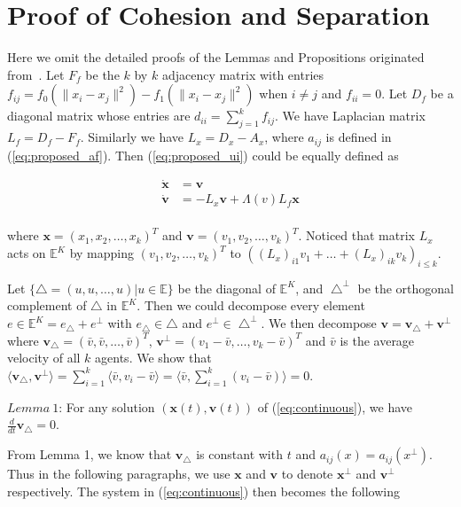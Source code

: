 \section{Proof of Cohesion and Separation}

Here we omit the detailed proofs of the Lemmas and Propositions originated from~\cite{CuckerDong2010}. Let $F_f$ be the $k$ by $k$ adjacency matrix with entries $f_{ij}=f_0(\|x_i-x_j\|^2)-f_1(\|x_i-x_j\|^2)$ when $i\neq j$ and $f_{ii}=0$. Let $D_f$ be a diagonal matrix whose entries are $d_{ii}=\sum_{j=1}^k f_{ij}$. We have Laplacian matrix $L_f=D_f-F_f$. Similarly we have $L_x=D_x-A_x$, where $a_{ij}$ is defined in (\ref{eq:proposed_af}). Then (\ref{eq:proposed_ui}) could be equally defined as

\begin{equation}\label{eq:continuous}
\begin{aligned}
\mathbf{\dot{x}}&=\mathbf{v}\\
\mathbf{\dot{v}}&=-L_x\mathbf{v}+\Lambda(v)L_f\mathbf{x}\\
\end{aligned}
\end{equation}

\noindent
where $\mathbf{x}=(x_1, x_2, \dots, x_k)^T$ and $\mathbf{v}=(v_1, v_2, \dots, v_k)^T$. Noticed that matrix $L_x$ acts on $\mathbb{E}^K$ by mapping $(v_1, v_2, \dots, v_k)^T$ to $((L_x)_{i1}v_1+\dots+(L_x)_{ik}v_k)_{i\leq k}$.

Let $\{\bigtriangleup={(u, u, \dots, u)|u\in\mathbb{E}}\}$ be the diagonal of $\mathbb{E}^K$, and $\bigtriangleup^{\perp}$ be the orthogonal complement of $\bigtriangleup$ in $\mathbb{E}^K$. Then we could decompose every element $e\in\mathbb{E}^K=e_{\bigtriangleup}+e^{\perp}$ with $e_{\bigtriangleup}\in\bigtriangleup$ and $e^{\perp}\in\bigtriangleup^{\perp}$. We then decompose $\mathbf{v}=\mathbf{v_{\bigtriangleup}+v^{\perp}}$ where $\mathbf{v_{\bigtriangleup}}=(\bar{v}, \bar{v}, \dots, \bar{v})^T$, $\mathbf{v^{\perp}}=(v_1-\bar{v}, \dots, v_k-\bar{v})^T$ and $\bar{v}$ is the average velocity of all $k$ agents. We show that $\langle\mathbf{v_{\bigtriangleup}}, \mathbf{v^{\perp}}\rangle=\sum_{i=1}^k\langle\bar{v},v_i-\bar{v}\rangle=\langle\bar{v},\sum_{i=1}^k(v_i-\bar{v})\rangle=0$.

$\mathit{Lemma\ 1}$: For any solution $(\mathbf{x}(t), \mathbf{v}(t))$ of (\ref{eq:continuous}), we have $\frac{d}{dt}\mathbf{v}_{\bigtriangleup}=0$.

From Lemma 1, we know that $\mathbf{v_{\bigtriangleup}}$ is constant with $t$ and $a_{ij}(x)=a_{ij}(x^{\perp})$. Thus in the following paragraphs, we use $\mathbf{x}$ and $\mathbf{v}$ to denote $\mathbf{x}^{\perp}$ and $\mathbf{v}^{\perp}$ respectively. The system in (\ref{eq:continuous}) then becomes the following

